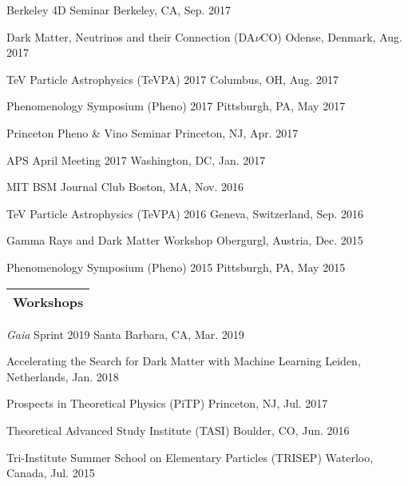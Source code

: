 \documentclass[11pt]{article}
\newenvironment{packed_itemize}{
\begin{itemize}
  \setlength{\itemsep}{3pt}
  \setlength{\parskip}{0pt}
  \setlength{\parsep}{0pt}}{\end{itemize}
}
\begin{document}
\begin{packed_itemize}
\item Berkeley 4D Seminar  \hfill Berkeley, CA, Sep. 2017
\item Dark Matter, Neutrinos and their Connection (DA$\nu$CO) \hfill Odense, Denmark, Aug. 2017
\item TeV Particle Astrophysics (TeVPA) 2017 \hfill Columbus, OH, Aug. 2017 
\item Phenomenology Symposium (Pheno) 2017 \hfill Pittsburgh, PA, May 2017 
\item Princeton Pheno \& Vino Seminar \hfill Princeton, NJ, Apr. 2017
\item APS April Meeting 2017 \hfill Washington, DC, Jan. 2017 
\item MIT BSM Journal Club \hfill Boston, MA, Nov. 2016
\item TeV Particle Astrophysics (TeVPA) 2016 \hfill Geneva, Switzerland, Sep. 2016 
\item Gamma Rays and Dark Matter Workshop \hfill Obergurgl, Austria, Dec. 2015
\item Phenomenology Symposium (Pheno) 2015 \hfill Pittsburgh, PA, May 2015
\end{packed_itemize}


\vspace{2.0mm}

\noindent
\begin{tabular*}{\textwidth}{l@{\extracolsep{\fill}}}
\large {\sc \Large{Workshops}}\\
\hline
\end{tabular*}\vspace{1.5mm}
\begin{packed_itemize}
\item \emph{Gaia} Sprint 2019 \hfill Santa Barbara, CA, Mar. 2019
\item Accelerating the Search for Dark Matter with Machine Learning \hfill Leiden, Netherlands, Jan. 2018
\item Prospects in Theoretical Physics (PiTP) \hfill Princeton, NJ, Jul. 2017
\item Theoretical Advanced Study Institute (TASI) \hfill Boulder, CO, Jun. 2016
\item Tri-Institute Summer School on Elementary Particles (TRISEP) \hfill Waterloo, Canada, Jul. 2015
\end{packed_itemize}

\end{document}
